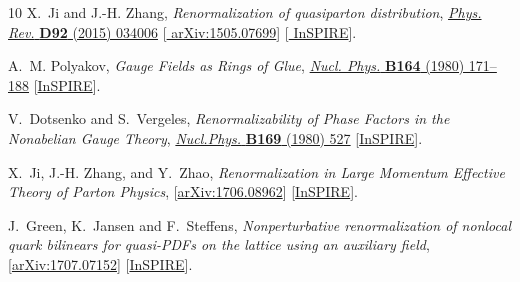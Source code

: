 \begin{thebibliography}{10}
X.~Ji and J.-H. Zhang, {\it {Renormalization of quasiparton distribution}},
\href{http://dx.doi.org/10.1103/PhysRevD.92.034006}{{\em Phys. Rev.} {\bfseries
  D92} (2015) 034006} [\href{http://arxiv.org/abs/1505.07699}{{\ttfamily
  arXiv:1505.07699}}] [\href{http://inspirehep.net/record/1373537}{{\ttfamily
  InSPIRE}}].

A.~M. Polyakov, {\it {Gauge Fields as Rings of Glue}},
\href{http://dx.doi.org/10.1016/0550-3213(80)90507-6}{{\em Nucl. Phys.}
  {\bfseries B164} (1980) 171--188}
  [\href{http://inspirehep.net/record/157352}{{\ttfamily InSPIRE}}].

V.~Dotsenko and S.~Vergeles, {\it {Renormalizability of Phase Factors in the
  Nonabelian Gauge Theory}},
\href{http://dx.doi.org/10.1016/0550-3213(80)90103-0}{{\em Nucl.Phys.}
  {\bfseries B169} (1980) 527}
  [\href{http://inspirehep.net/record/144525}{{\ttfamily InSPIRE}}].

X.~Ji, J.-H. Zhang, and Y.~Zhao,
{\it {Renormalization in Large Momentum Effective Theory of Parton Physics}},
  [\href{http://arxiv.org/abs/1706.08962}{{\ttfamily arXiv:1706.08962}}]
  [\href{http://inspirehep.net/record/1607797}{{\ttfamily InSPIRE}}].


  J.~Green, K.~Jansen and F.~Steffens,
  {\it {Nonperturbative renormalization of nonlocal quark bilinears for quasi-PDFs on the lattice using an auxiliary field}},
    [\href{http://arxiv.org/abs/1707.07152}{{\ttfamily arXiv:1707.07152}}]
  [\href{http://inspirehep.net/record/1611305}{{\ttfamily InSPIRE}}].

\end{thebibliography}\endgroup
